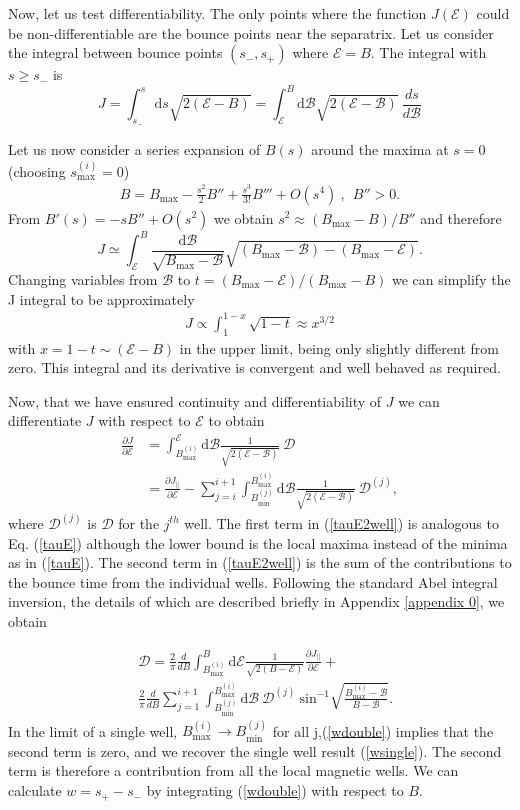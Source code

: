 \documentclass[aip,pop,reprint]{revtex4-1}
\newcommand*{\cB}{\mathcal{B}}
\newcommand*{\cD}{\mathcal{D}}
\newcommand*{\cE}{\mathcal{E}}
\newcommand*{\Jpl}{J_{||}}
\newcommand*{\dt}{\mathrm{d}}
\newcommand*\smpi[2]{s_{#1}^{#2}}
\newcommand*{\Bmin}{B_{\text{min}}}
\newcommand*{\Bmax}{B_{\text{max}}}
\begin{document}
Now, let us test differentiability. The only points  where the function $J(\cE)$ could be non-differentiable are the bounce points near the separatrix. Let us consider the integral between bounce points $(\smpi{-}{},\smpi{+}{})$ where $\cE=B$. The integral with $s\geq \smpi{-}{}$ is $$J=\int_{\smpi{-}{}}^{s} \dt s\sqrt{2(\cE-B)}= \int_{\cE}^{B} \dt \cB\sqrt{2(\cE-\cB)}\:\frac{ds}{d\cB} $$
 
Let us now consider a series expansion of $B(s)$ around the maxima at $s=0$ (choosing $s^{(i)}_{\text{max}}=0$)
\begin{align}
B=\Bmax -\frac{s^2}{2} B'' +\frac{s^3}{3!} B'''+ O(s^4)\:,\:\: B''>0. \label{Bs}
\end{align}
From $B'(s)= -s B''+O(s^2)$ we obtain $s^2 \approx (\Bmax-B)/B''$ and therefore
$$J \simeq  \int_\cE^{B} \frac{\dt \cB}{\sqrt{\Bmax-\cB}}\sqrt{(\Bmax-\cB)-(\Bmax-\cE)}.$$ Changing variables from $\cB$ to $t=(\Bmax-\cE)/(\Bmax-B)$ we can simplify the J integral to be approximately \begin{align}
J\propto \int_1^{1-x} \sqrt{1-t}\approx x^{3/2} \label{Jsepa}
\end{align}
 with $x=1-t\sim(\cE -B)$ in the upper limit, being only slightly different from zero. This integral and its derivative is convergent and well behaved as required.
 
Now, that we have ensured continuity and differentiability of $J$ we can differentiate $J$ with respect to $\cE$ to obtain
\begin{align}
\frac{\partial J}{\partial \cE}&=\int_{\Bmax^{(i)}}^\cE \dt\cB\frac{1}{\sqrt{2(\cE-\cB)}}\: \cD\nonumber\\
&= \frac{\partial \Jpl}{\partial \cE}-\sum_{j=i}^{i+1} \int_{\Bmin^{(j)}}^{\Bmax^{(i)}}\dt\cB\frac{1}{\sqrt{2(\cE-\cB)}}\: \cD^{(j)} ,
\label{tauE2well}
\end{align}
 where $\cD^{(j)}$ is $\cD$ for the $j^{th}$ well. The first term in (\ref{tauE2well}) is analogous to Eq. (\ref{tauE}) although the lower bound is the local maxima instead of the minima as in (\ref{tauE}). The second term in (\ref{tauE2well}) is the sum of the contributions to the bounce time from the individual wells. Following the standard Abel integral inversion, the details of which are described briefly in Appendix \ref{appendix 0}, we obtain 

 \begin{align}
 &\cD=\frac{2}{\pi} \frac{d}{dB}\int_{\Bmax^{(i)}}^B \dt\cE \frac{1}{\sqrt{2(B-\cE)}}\frac{\partial \Jpl}{\partial \cE}+\label{wdouble}\\
 &\frac{2}{\pi}\frac{d}{dB} \sum_{j=1}^{i+1}\int_{\Bmin^{(j)}}^{\Bmax^{(i)}} \dt\cB\:\cD^{(j)}\: \text{sin}^{-1}{\sqrt{\frac{\Bmax^{(i)}-\cB}{B-\cB}}} .\nonumber 
 \end{align}
In the limit of a single well, $\Bmax^{(i)} \rightarrow \Bmin^{(j)}$ for all j,(\ref{wdouble}) implies that the second term is zero, and we recover the single well result (\ref{wsingle}). The second term is therefore a contribution from all the local magnetic wells. We can calculate $w=\smpi{+}{}-\smpi{-}{}$ by integrating (\ref{wdouble}) with respect to $B$.
\end{document}

